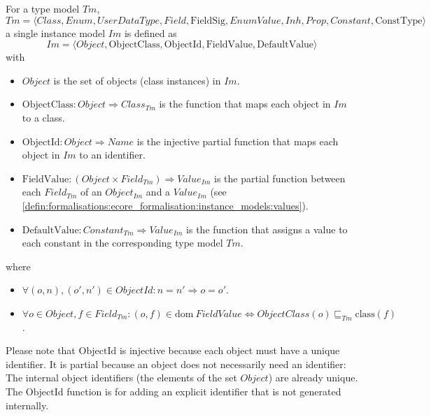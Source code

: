 \begin{defin}
\label{defin:formalisations:ecore_formalisation:instance_models:instance_model}
For a type model $Tm$,
\begin{equation*}
    Tm = \langle Class, Enum, UserDataType, Field, \mathrm{FieldSig}, EnumValue, Inh, Prop, Constant, \mathrm{ConstType} \rangle
\end{equation*}
a single instance model $Im$ is defined as
\begin{equation*}
    Im = \langle Object, \mathrm{ObjectClass}, \mathrm{ObjectId}, \mathrm{FieldValue}, \mathrm{DefaultValue} \rangle
\end{equation*}
with
\begin{itemize}
    \item $Object$ is the set of objects (class instances) in $Im$.
    \item $\mathrm{ObjectClass}: Object \Rightarrow Class_{Tm}$ is the function that maps each object in $Im$ to a class.
    \item $\mathrm{ObjectId}: Object \Rightarrow Name$ is the injective partial function that maps each object in $Im$ to an identifier.
    \item $\mathrm{FieldValue}: (Object \times Field_{Tm}) \Rightarrow Value_{Im}$ is the partial function between each $Field_{Tm}$ of an $Object_{Im}$ and a $Value_{Im}$ (see \cref{defin:formalisations:ecore_formalisation:instance_models:values}).
    \item $\mathrm{DefaultValue}: Constant_{Tm} \Rightarrow Value_{Im}$ is the function that assigns a value to each constant in the corresponding type model $Tm$.
\end{itemize}
where
\begin{itemize}
    \item $\forall ( o, n ), ( o', n' ) \in ObjectId: n = n' \Longrightarrow o = o'$.
    \item $\forall o \in Object, f \in Field_{Tm}: ( o, f ) \in \mathrm{dom}\ FieldValue \Longleftrightarrow ObjectClass(o) \sqsubseteq_{Tm} \mathrm{class}(f)$.
\end{itemize}

\end{defin}

Please note that $\mathrm{ObjectId}$ is injective because each object must have a unique identifier. It is partial because an object does not necessarily need an identifier: The internal object identifiers (the elements of the set $Object$) are already unique. The $\mathrm{ObjectId}$ function is for adding an explicit identifier that is not generated internally.

